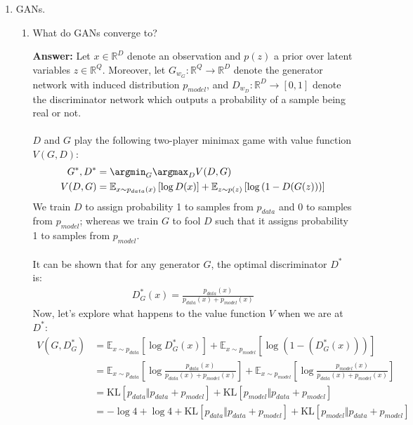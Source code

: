 \documentclass{article}
\newenvironment{QandA}{\begin{enumerate}[label=\arabic*.]}{\end{enumerate}}
\newenvironment{InnerQandA}{\begin{enumerate}[label=\roman*.]}{\end{enumerate}}
\newenvironment{answer}{\par\normalfont \textbf{Answer:}}{}
\newcommand{\R}{\mathbb{R}}
\newcommand{\KL}[2]{\text{KL}\left[#1 \Vert #2 \right]}
\begin{document}
\begin{QandA}
    \item GANs.
    \begin{InnerQandA}
        \item What do GANs converge to?
        \begin{answer}
            Let $x \in \R^D$ denote an observation and $p(z)$ a prior over latent variables $z \in \R^Q$. Moreover, let $G_{w_G}: \R^Q \rightarrow \R^D$ denote the generator network with induced distribution $p_{model}$, and $D_{w_D}: \R^D \rightarrow \left[ 0, 1\right]$ denote the discriminator network which outputs a probability of a sample being real or not. \\\\
            $D$ and $G$ play the following  two-player minimax game with value function $V(G, D)$:
            \begin{align*}
                G^*, D^* &= \argmin_{G} \argmax_{D} V(D, G) \\
                V(D, G) &= \mathbb{E}_{x \sim p_{data}(x)}\left[ \log D(x) \right] + \mathbb{E}_{z \sim p(z)} \left[\log \left( 1 - D(G(z)) \right) \right]
            \end{align*}
            We train $D$ to assign probability 1 to samples from $p_{data}$ and 0 to samples from $p_{model}$; whereas we train $G$ to fool $D$ such that it assigns probability 1 to samples from $p_{model}$.\\\\
            It can be shown that for any generator $G$, the optimal discriminator $D^*$ is:
            \begin{align*}
                D^*_{G}(x) = \frac{p_{data}(x)}{p_{data}(x) + p_{model}(x)}
            \end{align*}
            Now, let's explore what happens to the value function $V$ when we are at $D^*$:
            \begin{align*}
                V(G, D^*_G) &= \mathbb{E}_{x \sim p_{data}} \left[ \log D^*_G(x) \right] + \mathbb{E}_{x \sim p_{model}} \left[\log(1 - \left( D^*_G (x) \right)) \right] \\
                &= \mathbb{E}_{x \sim p_{data}} \left[ \log \frac{p_{data}(x)}{p_{data}(x) + p_{model}(x)}\right] + \mathbb{E}_{x \sim p_{model}} \left[ \log \frac{p_{model}(x)}{p_{data}(x) + p_{model}(x)}\right] \\
                &= \KL{p_{data}}{p_{data} + p_{model}} + \KL{p_{model}}{p_{data} + p_{model}}  \\
                &= -\log4 + \log4 + \KL{p_{data}}{p_{data} + p_{model}} + \KL{p_{model}}{p_{data} + p_{model}} \\

\end{align*}
\end{answer}
\end{InnerQandA}
\end{QandA}
\end{document}
